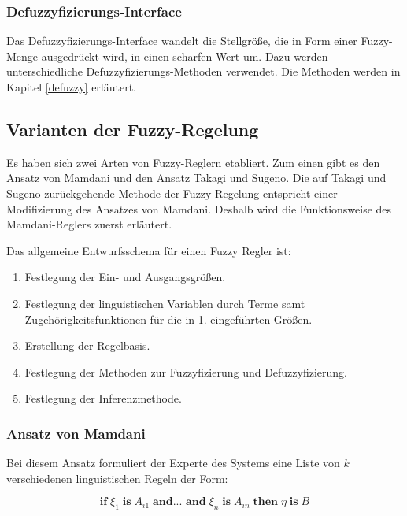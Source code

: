\documentclass[12pt,a4paper,bibliography=totocnumbered,listof=totocnumbered]{scrartcl}
\theoremstyle{Umgebung}
\begin{document}
\subsubsection{Defuzzyfizierungs-Interface}

Das Defuzzyfizierungs-Interface wandelt die Stellgröße, die in Form einer Fuzzy-Menge ausgedrückt wird, in einen scharfen Wert um. Dazu werden unterschiedliche Defuzzyfizierungs-Methoden verwendet. Die Methoden werden in Kapitel \ref{defuzzy} erläutert.


\subsection{Varianten der Fuzzy-Regelung}

Es haben sich zwei Arten von Fuzzy-Reglern etabliert. Zum einen gibt es den Ansatz von Mamdani und den Ansatz Takagi und Sugeno. Die auf Takagi und Sugeno zurückgehende Methode der Fuzzy-Regelung entspricht einer Modifizierung des Ansatzes von Mamdani.
Deshalb wird die Funktionsweise des Mamdani-Reglers zuerst erläutert.

Das allgemeine Entwurfsschema für einen Fuzzy Regler ist:

\begin{enumerate} 
	\item Festlegung der Ein- und Ausgangsgrößen.
	\item Festlegung der linguistischen Variablen durch Terme samt Zugehörigkeitsfunktionen
	für die in 1. eingeführten Größen.
	\item Erstellung der Regelbasis.
	\item Festlegung der Methoden zur Fuzzyfizierung und Defuzzyfizierung.
	\item Festlegung der Inferenzmethode.
\end{enumerate}

\subsubsection{Ansatz von Mamdani}

Bei diesem Ansatz formuliert der Experte des Systems eine Liste von $k$ verschiedenen linguistischen Regeln  der Form:

\begin{equation}
	\textbf{if} \; \xi_1 \; \textbf{is} \; A_{i1} \; \textbf{and... and} \; \xi_n \; \textbf{is} \; A_{in} \; \textbf{then} \; \eta \;\textbf{is} \;B
\end{equation}
\end{document}
